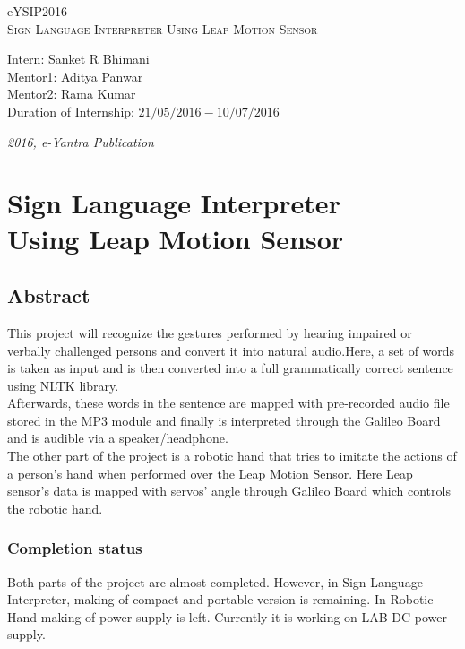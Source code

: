 \documentclass[a4paper,12pt,oneside]{book}
\begin{document}
\begin{titlepage}
\raggedright
{\Large eYSIP2016\\[1cm]}
{\Huge\scshape Sign Language Interpreter Using Leap Motion Sensor \\[.1in]}
\vfill
\begin{flushright}
{\large Intern: Sanket R Bhimani \\}
{\large Mentor1: Aditya Panwar\\}
{\large Mentor2: Rama Kumar \\}
{\large Duration of Internship: $ 21/05/2016-10/07/2016 $ \\}
\end{flushright}

{\itshape 2016, e-Yantra Publication}
\end{titlepage}

\chapter[Project Tag]{Sign Language Interpreter\\Using Leap Motion Sensor}
\section*{Abstract}
This project will recognize the gestures performed by hearing impaired or verbally challenged persons and convert it into natural audio.Here, a set of words is taken as input and is then converted into a full grammatically correct sentence using NLTK library.\\
Afterwards, these words in the sentence are mapped with pre-recorded audio file stored in the MP3 module and finally is interpreted through the Galileo Board and is audible via a speaker/headphone.\\
The other part of the project is a robotic hand that tries to imitate the actions of a person's hand when performed over the Leap Motion Sensor. Here Leap sensor's data is mapped with servos' angle through Galileo Board which controls the robotic hand.

\subsection*{Completion status}
Both parts of the project are almost completed. However, in Sign Language Interpreter, making of compact and portable version is remaining. In Robotic Hand making of power supply is left. Currently it is working on LAB DC power supply.
\end{document}
